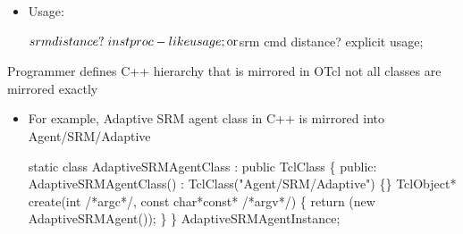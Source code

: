 \documentclass[landscape]{foils}
\begin{document}
\begin{itemize}
\item Usage:
  \begin{program}
    $srm distance?        \; instproc-like usage;
{\rm{}or}
    $srm cmd distance?    \; explicit usage;
  \end{program}

\end{itemize}

\begin{comment}
\item \verb|\placefig{tclobject-cmd}|
\item instproc-like calling sequence
\item overloading
\item direct executing
\item hierarchical resolution
\end{comment}

Programmer defines C++ hierarchy that is mirrored in OTcl
not all classes are mirrored exactly

\begin{comment}
  \item \verb|\placefig{tclclass}|
  \item ``/'' as separator character for interpreted hierarchy
  \item root of mirrored class hierarchies is TclObject
  \item extra C++ classes that are not mirrored in OTcl
  \item TclClass is adjunct to mirrored hierarchy
\end{comment}

\begin{itemize}
\item For example, Adaptive SRM agent class in C++
  is mirrored into Agent/SRM/Adaptive 
\begin{program}
    static class AdaptiveSRMAgentClass : public TclClass \{
    public:
      AdaptiveSRMAgentClass() : TclClass("Agent/SRM/Adaptive") \{\}
      TclObject* create(int /*argc*/, const char*const* /*argv*/) \{
        return (new AdaptiveSRMAgent());
      \}
    \} AdaptiveSRMAgentInstance;
\end{program}
\end{itemize}
\end{document}
